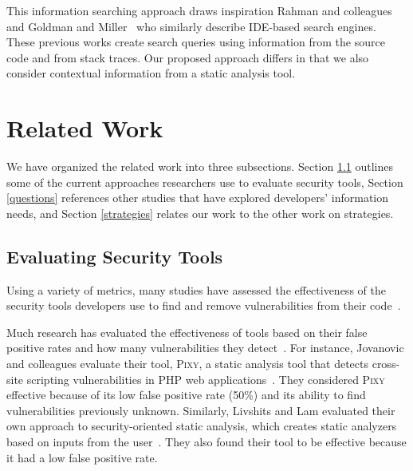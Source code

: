 \documentclass[10pt,journal,compsoc]{IEEEtran}
\begin{document}
This information searching approach draws inspiration Rahman and colleagues~\cite{rahman2014towards} and Goldman and Miller~\cite{goldman2009codetrail} who similarly describe IDE-based search engines.
These previous works create search queries using information from the source code and from stack traces.
Our proposed approach differs in that we also consider contextual information from a static analysis tool.






\section{Related Work}
\label{sec:rw}

We have organized the related work into three subsections. 
Section \ref{evaluation} outlines some of the current approaches researchers use to evaluate security tools, Section \ref{questions} references other studies that have explored developers' information needs, and Section \ref{strategies} relates our work to the other work on strategies.

\subsection{Evaluating Security Tools}
\label{evaluation}
Using a variety of metrics, many studies have assessed the effectiveness of the security tools developers use to find and remove vulnerabilities from their code~\cite{martin2005finding, austin2011one, livshits2005finding}.  

Much research has evaluated the effectiveness of tools based on their false positive rates and how many vulnerabilities they detect~\cite{jovanovic2006pixy, austin2011one, dukes2013case}. 
For instance, Jovanovic and colleagues evaluate their tool, \textsc{Pixy}, a static analysis tool that detects cross-site scripting vulnerabilities in PHP web applications~\cite{jovanovic2006pixy}. 
They considered \textsc{Pixy} effective because of its low false positive rate (50\%) and its ability to find vulnerabilities previously unknown. 
Similarly, Livshits and Lam evaluated their own approach to security-oriented static analysis, which creates static analyzers based on inputs from the user~\cite{livshits2005finding}. 
They also found their tool to be effective because it had a low false positive rate. 
\end{document}
